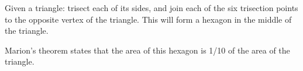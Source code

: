 Given a triangle: trisect each of its sides, and join each of the six
trisection points to the opposite vertex of the triangle. This will 
form a hexagon in the middle of the triangle.
\par
Marion's theorem states that the area of this hexagon is 1/10 of the
area of the triangle.